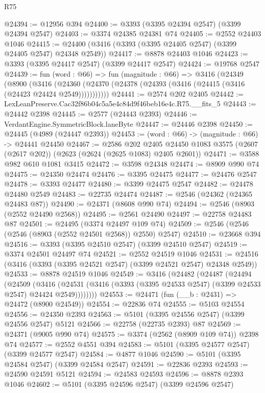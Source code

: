 \begin{lexlean}{R75}
\begin{coremodule}
@24394 := @12956 @394
@24400 := @3393 (@3395 @24394 @2547) (@3399 @24394 @2547)
@24403 := @3374 @24385 @24381 @74
@24405 := @2552 @24403 @1046
@24415 := @24400 (@3416 (@3393 (@3395 @24405 @2547) (@3399 @24405 @2547) @24348 @2549))
@24417 := @8878 @24403 @1046
@24423 := @3393 (@3395 @24417 @2547) (@3399 @24417 @2547)
@24424 := @19768 @2547
@24439 := fun (word : @66) =>
  fun (magnitude : @66) =>
  @3416
    (@24349
      (@8900
        (@3416 (@24360 (@24370 (@24378 (@24393 (@3416 (@24415 (@3416 (@24423 @24424 @2549)))))))))))
@24441 := @2574 @202 @2405
@24442 := LexLeanPreserve.Cac32f86b04c5a5e4c84d9f46beb16e4c.R75.__fits_5
@24443 := @24442 @2398
@24445 := @2577 (@24443 @2393)
@24446 := VerdantEngine.SymmetricBlock.laneByte
@24447 := @24446 @2398
@24450 := @24445 (@4989 (@24447 @2393))
@24453 := (word : @66) -> (magnitude : @66) -> @24441 @24450
@24467 := @2586
    @202
    @2405
    @24450
    @1083
    @3575
    (@2607 (@2617 @202))
    (@2623 (@2624 (@2625 @1083) @2405 @2601))
@24471 := @3588 @982 @610 @1081 @3415
@24472 := @3598 @24348
@24474 := @8909 @990 @74
@24475 := @24350 @24474
@24476 := @3395 @24475
@24477 := @24476 @2547
@24478 := @3393 @24477
@24480 := @3399 @24475 @2547
@24482 := @24478 @24480 @2549
@24483 := @22735 @24474
@24487 := @2546 (@24362 (@24365 @24483 @87))
@24490 := @24371 (@8608 @990 @74)
@24494 := @2546 (@8903 (@2552 @24490 @2568))
@24495 := @2561 @24490
@24497 := @22758 @24483 @87
@24501 := @24495 (@3374 @24497 @109 @74)
@24509 := @2546 (@2546 (@2546 (@8903 (@2552 @24501 @2568)) @2550) @2547)
@24510 := @23668 @394
@24516 := @3393 (@3395 @24510 @2547) (@3399 @24510 @2547)
@24519 := @3374 @24501 @24497 @74
@24521 := @2552 @24519 @1046
@24531 := @24516 (@3416 (@3393 (@3395 @24521 @2547) (@3399 @24521 @2547) @24348 @2549))
@24533 := @8878 @24519 @1046
@24549 := @3416
    (@24482
      (@24487
        (@24494
          (@24509
            (@3416
              (@24531 (@3416 (@3393 (@3395 @24533 @2547) (@3399 @24533 @2547) @24424 @2549))))))))
@24553 := @24471 (fun (__b : @2431) => @24472 (@8900 @24549))
@24554 := @22836 @74
@24555 := @5103 @24554
@24556 := @24350 @2393
@24563 := @5101 (@3395 @24556 @2547) (@3399 @24556 @2547) @5121
@24566 := @22758 (@22735 @2393) @87
@24569 := @24371 (@9005 @990 @74)
@24575 := @3374 (@2562 (@8909 @109 @74)) @2398 @74
@24577 := @2552 @4551 @394
@24583 := @5101 (@3395 @24577 @2547) (@3399 @24577 @2547)
@24584 := @4877 @1046
@24590 := @5101 (@3395 @24584 @2547) (@3399 @24584 @2547)
@24591 := @22836 @2393
@24593 := @24590 @24591 @5121
@24594 := @24583 @24593
@24596 := @8878 @2393 @1046
@24602 := @5101 (@3395 @24596 @2547) (@3399 @24596 @2547)

\end{coremodule}
\end{lexlean}
